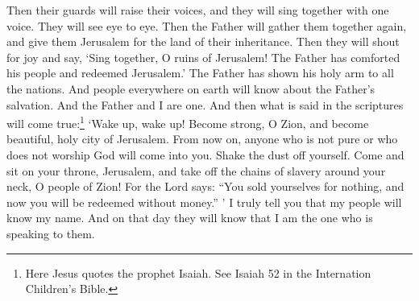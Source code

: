 \bverse \iffalse Then shall their watchmen lift up their voice, and with the voice together shall they sing; for they shall see eye to eye. \fi
Then their guards will raise their voices, and they will sing together with one voice. They will see eye to eye.
\bverse \iffalse Then will the Father gather them together again, and give unto them Jerusalem for the land of their inheritance. \fi
Then the Father will gather them together again, and give them Jerusalem for the land of their inheritance.
\bverse \iffalse Then shall they break forth into joy--Sing together, ye waste places of Jerusalem; for the Father hath comforted his people, he hath redeemed Jerusalem. \fi
Then they will shout for joy and say, \lq Sing together, O ruins of Jerusalem! The Father has comforted his people and redeemed Jerusalem.\rq
\bverse \iffalse The Father hath made bare his holy arm in the eyes of all the nations; and all the ends of the earth shall see the salvation of the Father; and the Father and I are one. \fi
The Father has shown his holy arm to all the nations. And people everywhere on earth will know about the Father's salvation. And the Father and I are one.
\bverse \iffalse And then shall be brought to pass that which is written: Awake, awake again, and put on thy strength, O Zion; put on thy beautiful garments, O Jerusalem, the holy city, for henceforth there shall no more come into thee the uncircumcised and the unclean. \fi
And then what is said in the scriptures will come true:\footnote{Here Jesus quotes the prophet Isaiah. See Isaiah 52 in the Internation Children's Bible.} \lq Wake up, wake up! Become strong, O Zion, and become beautiful, holy city of Jerusalem. From now on, anyone who is not pure or who does not worship God will come into you.
\bverse \iffalse Shake thyself from the dust; arise, sit down, O Jerusalem; loose thyself from the bands of thy neck, O captive daughter of Zion. \fi
Shake the dust off yourself. Come and sit on your throne, Jerusalem, and take off the chains of slavery around your neck, O people of Zion!
\bverse \iffalse For thus saith the Lord: Ye have sold yourselves for naught, and ye shall be redeemed without money. \fi
For the Lord says: ``You sold yourselves for nothing, and now you will be redeemed without money.'' \rq
\bverse \iffalse Verily, verily, I say unto you, that my people shall know my name; yea, in that day they shall know that I am he that doth speak. \fi
I truly tell you that my people will know my name. And on that day they will know that I am the one who is speaking to them.
